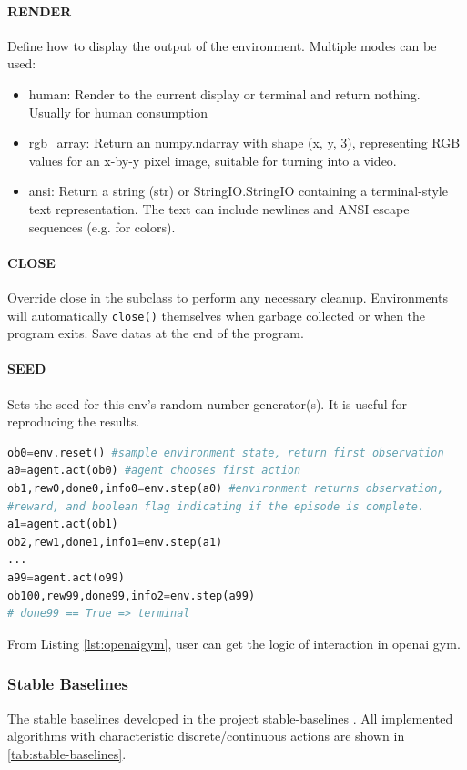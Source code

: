 \paragraph{RENDER} Define how to display the output of the environment. Multiple modes can be used: 
\begin{itemize}
	\item human: Render to the current display or terminal and return nothing. Usually for human consumption
	\item rgb\_array: Return an numpy.ndarray with shape (x, y, 3), representing RGB values for an x-by-y pixel image, suitable for turning into a video.
	\item ansi: Return a string (str) or StringIO.StringIO containing a terminal-style text representation. The text can include newlines and ANSI escape sequences (e.g. for colors).
\end{itemize}

\paragraph{CLOSE} Override close in the subclass to perform any necessary cleanup. Environments will automatically \texttt{close()} themselves when garbage collected or when the program exits. Save datas at the end of the program.
\paragraph{SEED} Sets the seed for this env's random number generator(s). It is useful for reproducing the results.
\begin{lstlisting}[caption={Logic of \gls{openai gym} Interaction},label={lst:openaigym},language=python]
ob0=env.reset() #sample environment state, return first observation
a0=agent.act(ob0) #agent chooses first action
ob1,rew0,done0,info0=env.step(a0) #environment returns observation,
#reward, and boolean flag indicating if the episode is complete.
a1=agent.act(ob1)
ob2,rew1,done1,info1=env.step(a1)
...
a99=agent.act(o99)
ob100,rew99,done99,info2=env.step(a99)
# done99 == True => terminal
\end{lstlisting}

From Listing \ref{lst:openaigym}, user can get the logic of interaction in \gls{openai gym}.

\subsubsection{Stable Baselines}
The stable baselines developed in the project stable-baselines \parencite{stable-baselines}. All implemented algorithms with characteristic discrete/continuous actions are shown in \ref{tab:stable-baselines}.

